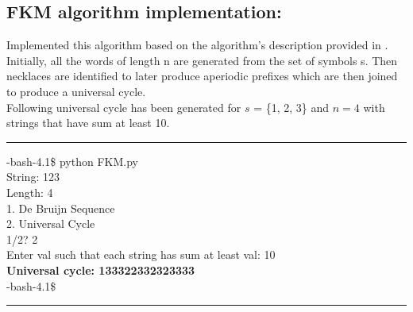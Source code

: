 \documentclass[12pt,twoside]{article}
\begin{document}
\subsection{FKM algorithm implementation:}
Implemented this algorithm based on the algorithm's description provided in \cite{Sawada}. Initially, all the words of length n are generated from the set of symbols s. Then necklaces are identified to later produce aperiodic prefixes which are then joined to produce a universal cycle. \\ 
\hfill \break
\hfill \break
\hfill \break
\hfill \break
\hfill \break
\hfill \break
\hfill \break
\hfill \break
\hfill \break
Following universal cycle has been generated for $s$ = \{1, 2, 3\} and $n = 4$ with strings that have sum at least 10.\\
\noindent\rule{16.5cm}{1.0pt}
-bash-4.1\$ python FKM.py\\
String: 123\\
Length: 4\\
1. De Bruijn Sequence\\
2. Universal Cycle\\
1/2? 2\\
Enter val such that each string has sum at least val: 10\\
\textbf{Universal cycle: 133322332323333}\\
-bash-4.1\$ \\
\noindent\rule{16.5cm}{1.0pt} \\ \\
\end{document}
